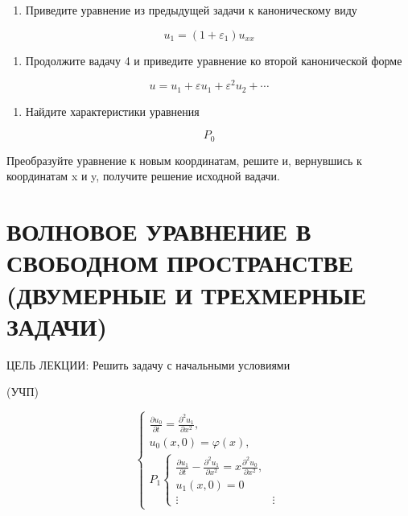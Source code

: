 \documentclass[
]{article}
\providecommand{\tightlist}{%
  \setlength{\itemsep}{0pt}\setlength{\parskip}{0pt}}
\begin{document}
\begin{enumerate}
\def\labelenumi{\arabic{enumi}.}
\setcounter{enumi}{3}
\tightlist
\item
  Приведите уравнение из предыдущей задачи к каноническому виду
\end{enumerate}

\[
u_1 = (1 + \varepsilon_1) u_{xx}
\]

\begin{enumerate}
\def\labelenumi{\arabic{enumi}.}
\setcounter{enumi}{4}
\tightlist
\item
  Продолжите вадачу 4 и приведите уравнение ко второй канонической форме
\end{enumerate}

\[
u = u_1 + \varepsilon u_1 + \varepsilon^2 u_2 + \cdots
\]

\begin{enumerate}
\def\labelenumi{\arabic{enumi}.}
\setcounter{enumi}{5}
\tightlist
\item
  Найдите характеристики уравнения
\end{enumerate}

\[
P_{0}
\]

Преобразуйте уравнение к новым координатам, решите и, вернувшись к
координатам x и y, получите решение исходной вадачи.

\section{ВОЛНОВОЕ УРАВНЕНИЕ В СВОБОДНОМ ПРОСТРАНСТВЕ (ДВУМЕРНЫЕ И
ТРЕХМЕРНЫЕ
ЗАДАЧИ)}\label{ux432ux43eux43bux43dux43eux432ux43eux435-ux443ux440ux430ux432ux43dux435ux43dux438ux435-ux432-ux441ux432ux43eux431ux43eux434ux43dux43eux43c-ux43fux440ux43eux441ux442ux440ux430ux43dux441ux442ux432ux435-ux434ux432ux443ux43cux435ux440ux43dux44bux435-ux438-ux442ux440ux435ux445ux43cux435ux440ux43dux44bux435-ux437ux430ux434ux430ux447ux438}

ЦЕЛЬ ЛЕКЦИИ: Решить задачу с начальными условиями

(УЧП)

\[
\begin{cases} \frac{\partial u_{0}}{\partial t} = \frac{\partial^{2} u_{1}}{\partial x^{2}}, \\ u_{0}(x, 0) = \varphi(x), \\ P_{1} \begin{cases} \frac{\partial u_{1}}{\partial t} - \frac{\partial^{2} u_{1}}{\partial x^{2}} = x \frac{\partial^{2} u_{0}}{\partial x^{2}}, \\ u_{1}(x, 0) = 0 \\ \vdots & \vdots \end{cases} \end{cases}
\]
\end{document}
